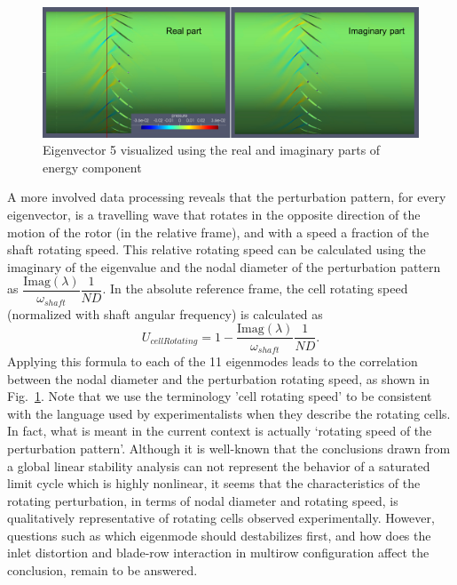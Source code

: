 \documentclass[journal,final]{new-aiaa}
\begin{document}
\begin{figure}[htb]
	\centering   
	\includegraphics[width=.6\textwidth]{pic/mode-with-nd5.png}
	\caption{Eigenvector 5 visualized using the real and imaginary parts
		of energy component}
	\label{fig:r67-eigenvector-18kpa}
\end{figure}


A more involved data processing reveals that the perturbation pattern,
for every eigenvector, is a travelling wave that rotates in the opposite
direction of the motion of the rotor (in the relative frame), and with a speed a fraction of the
shaft rotating speed. This relative rotating speed can be
calculated using the imaginary of the eigenvalue and the nodal diameter
of the perturbation pattern as $\dfrac{\text{Imag}(\lambda)}{\omega_{shaft}} \dfrac{1}{ND}$.
In the absolute reference frame, the cell rotating speed (normalized
with shaft angular frequency) is calculated as
\begin{equation}\label{cellrotspd}
U_{cellRotating}= 1-\dfrac{\text{Imag}(\lambda)}{\omega_{shaft}} \dfrac{1}{ND}.
\end{equation}
Applying this formula to each of the 11 eigenmodes leads to the
correlation between the nodal diameter and the perturbation rotating speed, as shown in Fig.~\ref{fig:r67-eigenvector-18kpa}. Note that we use the terminology 'cell rotating speed'
to be consistent with the language used by experimentalists when they describe
the rotating cells. In fact, what is meant in the current context is actually
`rotating speed of the perturbation pattern'.
Although it is well-known that the conclusions drawn from a global linear
stability analysis can not represent the behavior of a saturated limit cycle
which is highly nonlinear, it seems that the characteristics of the
rotating perturbation,
in terms of nodal diameter and rotating speed, is qualitatively representative
of rotating cells observed experimentally. However, questions such as which eigenmode
should destabilizes first, and how does the inlet distortion and blade-row interaction in
multirow configuration affect the conclusion, remain to be answered.
\end{document}
